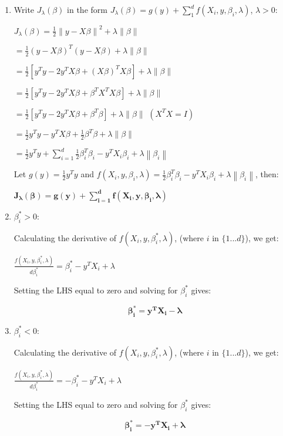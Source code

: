\documentclass{article}
\newcommand{\norm}[1]{\left\lVert#1\right\rVert}
\begin{document}
\begin{enumerate}
\setlength\itemsep{1em}

\item Write $J_\lambda(\beta)$ in the form $J_\lambda(\beta)=g(y)+\sum_1^df(X_i,y,\beta_i,\lambda)$, $\lambda > 0$: 

$J_\lambda(\beta)=\frac{1}{2}\norm{y-X\beta}^2+\lambda\norm{\beta}$ 

$=\frac{1}{2}(y-X\beta)^T(y-X\beta)+\lambda\norm{\beta}$ 

$=\frac{1}{2}[y^Ty-2y^TX\beta+(X\beta)^TX\beta]+\lambda\norm{\beta}$ 

$=\frac{1}{2}[y^Ty-2y^TX\beta+\beta^TX^TX\beta]+\lambda\norm{\beta}$ 

$=\frac{1}{2}[y^Ty-2y^TX\beta+\beta^T\beta]+\lambda\norm{\beta}$ \hfill $(X^TX=I)$ 

$=\frac{1}{2}y^Ty-y^TX\beta+\frac{1}{2}\beta^T\beta+\lambda\norm{\beta}$ 

$=\frac{1}{2}y^Ty+\sum_{i=1}^d\frac{1}{2}\beta_i^T\beta_i-y^TX_i\beta_i+\lambda\norm{\beta_i}$ 

Let $g(y)=\frac{1}{2}y^Ty$ and $f(X_i,y,\beta_i,\lambda)=\frac{1}{2}\beta_i^T\beta_i-y^TX_i\beta_i+\lambda\norm{\beta_i}$, then: 

$\bm{J_\lambda(\beta)=g(y)+\sum_{i=1}^df(X_i,y,\beta_i,\lambda)}$ 



\item $\beta_i^\ast>0$:

Calculating the derivative of $f(X_i,y,\beta_i^\ast,\lambda)$, (where $i$ in $\{1...d\}$), we get: 

$\frac{f(X_i,y,\beta_i^\ast,\lambda)}{d\beta_i^\ast}=\beta_i^\ast-y^TX_i+\lambda$

Setting the LHS equal to zero and solving for $\beta_i^\ast$ gives:

\begin{equation}
\bm{\beta_i^\ast=y^TX_i-\lambda}
\end{equation}


\item $\beta_i^\ast<0$:

Calculating the derivative of $f(X_i,y,\beta_i^\ast,\lambda)$, (where $i$ in $\{1...d\}$), we get: 

$\frac{f(X_i,y,\beta_i^\ast,\lambda)}{d\beta_i^\ast}=-\beta_i^\ast-y^TX_i+\lambda$

Setting the LHS equal to zero and solving for $\beta_i^\ast$ gives:

\begin{equation}
\bm{\beta_i^\ast=-y^TX_i+\lambda}
\end{equation}


\end{enumerate}
\end{document}
